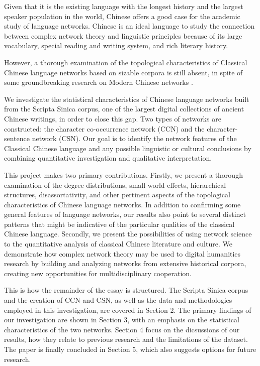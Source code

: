 \documentclass[11pt]{article}
\begin{document}
Given that it is the existing language with the longest history and the largest speaker population in the world, Chinese offers a good case for the academic study of language networks. Chinese is an ideal language to study the connection between complex network theory and linguistic principles because of its large vocabulary, special reading and writing system, and rich literary history.

However, a thorough examination of the topological characteristics of Classical Chinese language networks based on sizable corpora is still absent, in spite of some groundbreaking research on Modern Chinese networks \cite{Li2007,Liu2008}.

We investigate the statistical characteristics of Chinese language networks built from the Scripta Sinica corpus, one of the largest digital collections of ancient Chinese writings, in order to close this gap. Two types of networks are constructed: the character co-occurrence network (CCN) and the character-sentence network (CSN). Our goal is to identify the network features of the Classical Chinese language and any possible linguistic or cultural conclusions by combining quantitative investigation and qualitative interpretation.

This project makes two primary contributions. Firstly, we present a thorough examination of the degree distributions, small-world effects, hierarchical structures, disassortativity, and other pertinent aspects of the topological characteristics of Chinese language networks. In addition to confirming some general features of language networks, our results also point to several distinct patterns that might be indicative of the particular qualities of the classical Chinese language. Secondly, we present the possibilities of using network science to the quantitative analysis of classical Chinese literature and culture. We demonstrate how complex network theory may be used to digital humanities research by building and analyzing networks from extensive historical corpora, creating new opportunities for multidisciplinary cooperation.

This is how the remainder of the essay is structured. The Scripta Sinica corpus and the creation of CCN and CSN, as well as the data and methodologies employed in this investigation, are covered in Section 2. The primary findings of our investigation are shown in Section 3, with an emphasis on the statistical characteristics of the two networks. Section 4 focus on the dicsussions of our results, how they relate to previous research and the limitations of the dataset. The paper is finally concluded in Section 5, which also suggests options for future research.
\end{document}
